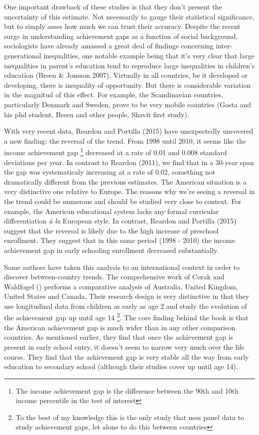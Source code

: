 \documentclass[11pt, a4paper]{article}\usepackage[]{graphicx}\usepackage[]{color}
\begin{document}
One important drawback of these studies is that they don't present the uncertainty of this estimate. Not necessarily to gauge their statistical significance, but to simply asses how much we can trust their accuracy. Despite the recent surge in understanding achievement gaps as a function of social background, sociologists have already amassed a great deal of findings concerning inter-generational inequalities, one notable example being that it's very clear that large inequalities in parent's education tend to reproduce large inequalities in children's education (Breen \& Jonsson 2007). Virtually in all countries, be it developed or developing, there is inequality of opportunity. But there is considerable variation in the magnitud of this effect. For example, the Scandinavian countries, particularly Denmark and Sweden, prove to be very mobile countries (Gosta and his phd student, Breen and other people, Shavit first study).

With very recent data, Reardon and Portilla (2015) have unexpectedly uncovered a new finding: the reversal of the trend. From 1998 until 2010, it seems like the income achievement gap \footnote{The income achievement gap is the difference between the 90th and 10th income percentile in the test of interest} decreased at a rate of 0.01 and 0.008 standard deviations per year. In contrast to Reardon (2011), we find that in a 30-year span the gap was systematicaly increasing at a rate of 0.02, something not dramatically different from the previous estimates. The American situation is a very distinctive one relative to Europe. The reasons why we're seeing a reversal in the trend could be numerous and should be studied very close to context. For example, the American educational system lacks any formal curricular differentiation \emph{à la} European style. In contrast, Reardon and Portilla (2015) suggest that the reversal is likely due to the high increase of preschool enrollment. They suggest that in this same period (1998 - 2010) the income achievement gap in early schooling enrollment decreased substantially.

Some authors have taken this analysis to an international context in order to discover between-country trends. The comprehensive work of Corak and Waldfogel () performs a comparative analysis of Australia, United Kingdom, United States and Canada. Their research design is very distinctive in that they use longitudinal data from children as early as age 2 and study the evolution of the achievement gap up until age 14 \footnote{To the best of my knowledge this is the only study that uses panel data to study achievement gaps, let alone to do this between countries}. The core finding behind the book is that the American achievement gap is much wider than in any other comparison countries. As mentioned earlier, they find that once the achievement gap is present in early school entry, it doesn't seem to narrow very much over the life course. They find that the achievement gap is very stable all the way from early education to secondary school (although their studies cover up until age 14). 
\end{document}
